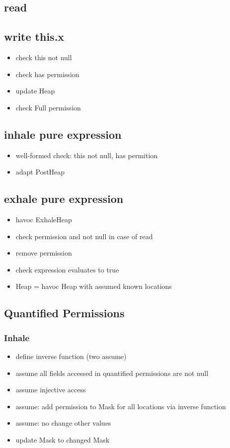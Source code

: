 \documentclass[12pt]{article}
\begin{document}
\subsection{read}

\subsection{write this.x}
\begin{itemize}
\item check this not null
\item check has permission
\item update Heap
\item check Full permission
\end{itemize}

\subsection{inhale pure expression}
\begin{itemize}
\item well-formed check: this not null, has permition
\item adapt PostHeap
\end{itemize}

\subsection{exhale pure expression}
\begin{itemize}
\item havoc ExhaleHeap
\item check permission and not null in case of read
\item remove permission
\item check expression evaluates to true
\item Heap = havoc Heap with assumed known locations
\end{itemize}

\subsection{Quantified Permissions}
\subsubsection{Inhale}
\begin{itemize}
\item define inverse function (two assume)
\item assume all fields accessed in quantified permissions are not null
\item assume injective access
\item assume: add permission to Mask for all locations via inverse function
\item assume: no change other values
\item update Mask to changed Mask
\end{itemize}
\end{document}
